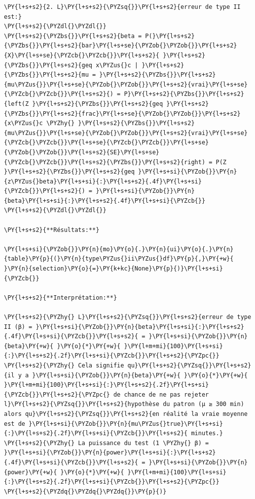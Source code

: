 \begin{tcolorbox}[breakable, size=fbox, boxrule=1pt, pad at break*=1mm,colback=cellbackground, colframe=cellborder]
\begin{Verbatim}[commandchars=\\\{\}]
\PY{l+s+s2}{2. L}\PY{l+s+s2}{\PYZsq{}}\PY{l+s+s2}{erreur de type II est:}
\PY{l+s+s2}{\PYZdl{}\PYZdl{}}
\PY{l+s+s2}{\PYZbs{}}\PY{l+s+s2}{beta = P(}\PY{l+s+s2}{\PYZbs{}}\PY{l+s+s2}{bar}\PY{l+s+se}{\PYZob{}\PYZob{}}\PY{l+s+s2}{X}\PY{l+s+se}{\PYZcb{}\PYZcb{}}\PY{l+s+s2}{ }\PY{l+s+s2}{\PYZbs{}}\PY{l+s+s2}{geq x\PYZus{}c | }\PY{l+s+s2}{\PYZbs{}}\PY{l+s+s2}{mu = }\PY{l+s+s2}{\PYZbs{}}\PY{l+s+s2}{mu\PYZus{}}\PY{l+s+se}{\PYZob{}\PYZob{}}\PY{l+s+s2}{vrai}\PY{l+s+se}{\PYZcb{}\PYZcb{}}\PY{l+s+s2}{) = P}\PY{l+s+s2}{\PYZbs{}}\PY{l+s+s2}{left(Z }\PY{l+s+s2}{\PYZbs{}}\PY{l+s+s2}{geq }\PY{l+s+s2}{\PYZbs{}}\PY{l+s+s2}{frac}\PY{l+s+se}{\PYZob{}\PYZob{}}\PY{l+s+s2}{x\PYZus{}c \PYZhy{} }\PY{l+s+s2}{\PYZbs{}}\PY{l+s+s2}{mu\PYZus{}}\PY{l+s+se}{\PYZob{}\PYZob{}}\PY{l+s+s2}{vrai}\PY{l+s+se}{\PYZcb{}\PYZcb{}}\PY{l+s+se}{\PYZcb{}\PYZcb{}}\PY{l+s+se}{\PYZob{}\PYZob{}}\PY{l+s+s2}{SE}\PY{l+s+se}{\PYZcb{}\PYZcb{}}\PY{l+s+s2}{\PYZbs{}}\PY{l+s+s2}{right) = P(Z }\PY{l+s+s2}{\PYZbs{}}\PY{l+s+s2}{geq }\PY{l+s+si}{\PYZob{}}\PY{n}{z\PYZus{}beta}\PY{l+s+si}{:}\PY{l+s+s2}{.4f}\PY{l+s+si}{\PYZcb{}}\PY{l+s+s2}{) = }\PY{l+s+si}{\PYZob{}}\PY{n}{beta}\PY{l+s+si}{:}\PY{l+s+s2}{.4f}\PY{l+s+si}{\PYZcb{}}
\PY{l+s+s2}{\PYZdl{}\PYZdl{}}

\PY{l+s+s2}{**Résultats:**}

\PY{l+s+si}{\PYZob{}}\PY{n}{mo}\PY{o}{.}\PY{n}{ui}\PY{o}{.}\PY{n}{table}\PY{p}{(}\PY{n}{type\PYZus{}ii\PYZus{}df}\PY{p}{,}\PY{+w}{ }\PY{n}{selection}\PY{o}{=}\PY{k+kc}{None}\PY{p}{)}\PY{l+s+si}{\PYZcb{}}

\PY{l+s+s2}{**Interprétation:**}

\PY{l+s+s2}{\PYZhy{} L}\PY{l+s+s2}{\PYZsq{}}\PY{l+s+s2}{erreur de type II (β) = }\PY{l+s+si}{\PYZob{}}\PY{n}{beta}\PY{l+s+si}{:}\PY{l+s+s2}{.4f}\PY{l+s+si}{\PYZcb{}}\PY{l+s+s2}{ = }\PY{l+s+si}{\PYZob{}}\PY{n}{beta}\PY{+w}{ }\PY{o}{*}\PY{+w}{ }\PY{l+m+mi}{100}\PY{l+s+si}{:}\PY{l+s+s2}{.2f}\PY{l+s+si}{\PYZcb{}}\PY{l+s+s2}{\PYZpc{}}
\PY{l+s+s2}{\PYZhy{} Cela signifie qu}\PY{l+s+s2}{\PYZsq{}}\PY{l+s+s2}{il y a }\PY{l+s+si}{\PYZob{}}\PY{n}{beta}\PY{+w}{ }\PY{o}{*}\PY{+w}{ }\PY{l+m+mi}{100}\PY{l+s+si}{:}\PY{l+s+s2}{.2f}\PY{l+s+si}{\PYZcb{}}\PY{l+s+s2}{\PYZpc{} de chance de ne pas rejeter l}\PY{l+s+s2}{\PYZsq{}}\PY{l+s+s2}{hypothèse du patron (μ ≥ 300 min) alors qu}\PY{l+s+s2}{\PYZsq{}}\PY{l+s+s2}{en réalité la vraie moyenne est de }\PY{l+s+si}{\PYZob{}}\PY{n}{mu\PYZus{}true}\PY{l+s+si}{:}\PY{l+s+s2}{.2f}\PY{l+s+si}{\PYZcb{}}\PY{l+s+s2}{ minutes.}
\PY{l+s+s2}{\PYZhy{} La puissance du test (1 \PYZhy{} β) = }\PY{l+s+si}{\PYZob{}}\PY{n}{power}\PY{l+s+si}{:}\PY{l+s+s2}{.4f}\PY{l+s+si}{\PYZcb{}}\PY{l+s+s2}{ = }\PY{l+s+si}{\PYZob{}}\PY{n}{power}\PY{+w}{ }\PY{o}{*}\PY{+w}{ }\PY{l+m+mi}{100}\PY{l+s+si}{:}\PY{l+s+s2}{.2f}\PY{l+s+si}{\PYZcb{}}\PY{l+s+s2}{\PYZpc{}}
\PY{l+s+s2}{\PYZdq{}\PYZdq{}\PYZdq{}}\PY{p}{)}
\end{Verbatim}
\end{tcolorbox}



